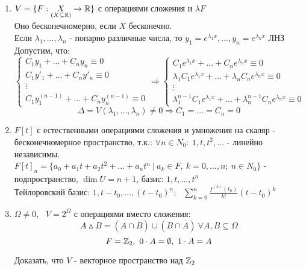 \begin{enumerate}
\begin{exercise}
    \end{exercise}
    \item $V = \{F:\underset{(X\subseteq \mathbb{R})}{X} \to \mathbb{R}\}$ с операциями сложения и $\lambda F$\\
    Оно бесконечномерно, если $X$ бесконечно.\\
    Если $\lambda_1, ..., \lambda_n$ - попарно различные числа, то $y_1 = e^{\lambda_1x},..., y_n = e^{\lambda_nx}$ ЛНЗ\\
    Допустим, что:
    $$\begin{cases}
      C_1y_1 + ... + C_ny_n \equiv 0\\
      C_1y'_1 + ... + C_ny'_n \equiv 0\\
      \vdots\\
      C_1y_1^{(n-1)} + ... + C_ny_n^{(n-1)} \equiv 0
    \end{cases} \Longrightarrow 
    \begin{cases}
      C_1e^{\lambda_1x} + ... + C_ne^{\lambda_nx} \equiv 0\\
      \lambda_1C_1e^{\lambda_1x} + ... + \lambda_nC_ne^{\lambda_nx} \equiv 0\\
      \vdots\\
      \lambda_1^{n-1} C_1e^{\lambda_1x} + ... + \lambda_n^{n-1} C_ne^{\lambda_nx} \equiv 0
    \end{cases}$$
    $$\Delta = V(\lambda_1,...,\lambda_n) \neq 0 \Longrightarrow C_1 = ... = C_n = 0$$
    \item $F[t]$ с естественными операциями сложения и умножения на скаляр - бесконечномерное пространство, т.к.: $\forall n \in N_0: \ 1, t, t^2,...$ - линейно независимы.\\
    $F[t]_n = \{a_0+a_1t+a_2t^2+...+a_nt^n \ | \ a_k\in F, \ k=0,...,n; \ n \in N_0\} $ - подпространство, $\dim U = n+1$, базис: $1,t,...,t^n$\\
    Тейлоровский базис: $1, t-t_0,...,(t-t_0)^n$; \ $\sum \limits_{k=0}^n\frac{f^{(k)}(t_0)}{k!}(t-t_0)^k$ 
    \item $\varOmega \neq 0$, \ $V = 2^\varOmega $ с операциями вместо сложения:
    $$A\vartriangle B = (A\cap \overline{B}) \cup (B\cap \overline{A}) \ \forall A,B \subseteq \varOmega$$
    $$F = \mathbb{Z}_2,  \ 0\cdot A = \emptyset , \ 1 \cdot A = A$$
    \begin{exercise}
      Доказать, что $V$ - векторное пространство над $\mathbb{Z}_2$
    \end{exercise}   
  \end{enumerate}
